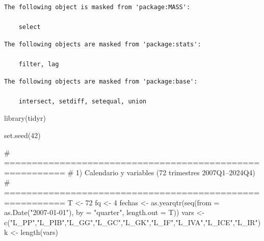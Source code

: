 \documentclass[
  spanish,
  letterpaper,
  DIV=11,
  numbers=noendperiod]{scrartcl}
\newenvironment{Shaded}{\begin{snugshade}}{\end{snugshade}}
\newcommand{\AttributeTok}[1]{\textcolor[rgb]{0.40,0.45,0.13}{#1}}
\newcommand{\CommentTok}[1]{\textcolor[rgb]{0.37,0.37,0.37}{#1}}
\newcommand{\DecValTok}[1]{\textcolor[rgb]{0.68,0.00,0.00}{#1}}
\newcommand{\FunctionTok}[1]{\textcolor[rgb]{0.28,0.35,0.67}{#1}}
\newcommand{\NormalTok}[1]{\textcolor[rgb]{0.00,0.23,0.31}{#1}}
\newcommand{\OtherTok}[1]{\textcolor[rgb]{0.00,0.23,0.31}{#1}}
\newcommand{\StringTok}[1]{\textcolor[rgb]{0.13,0.47,0.30}{#1}}
\begin{document}
\begin{verbatim}
The following object is masked from 'package:MASS':

    select
\end{verbatim}

\begin{verbatim}
The following objects are masked from 'package:stats':

    filter, lag
\end{verbatim}

\begin{verbatim}
The following objects are masked from 'package:base':

    intersect, setdiff, setequal, union
\end{verbatim}

\begin{Shaded}
\begin{Highlighting}[]
\FunctionTok{library}\NormalTok{(tidyr)}

\FunctionTok{set.seed}\NormalTok{(}\DecValTok{42}\NormalTok{)}

\CommentTok{\# =========================================================}
\CommentTok{\# 1) Calendario y variables (72 trimestres 2007Q1–2024Q4)}
\CommentTok{\# =========================================================}
\NormalTok{T  }\OtherTok{\textless{}{-}} \DecValTok{72}
\NormalTok{fq }\OtherTok{\textless{}{-}} \DecValTok{4}
\NormalTok{fechas }\OtherTok{\textless{}{-}} \FunctionTok{as.yearqtr}\NormalTok{(}\FunctionTok{seq}\NormalTok{(}\AttributeTok{from =} \FunctionTok{as.Date}\NormalTok{(}\StringTok{"2007{-}01{-}01"}\NormalTok{),}
                         \AttributeTok{by =} \StringTok{"quarter"}\NormalTok{, }\AttributeTok{length.out =}\NormalTok{ T))}
\NormalTok{vars }\OtherTok{\textless{}{-}} \FunctionTok{c}\NormalTok{(}\StringTok{"L\_PP"}\NormalTok{,}\StringTok{"L\_PIB"}\NormalTok{,}\StringTok{"L\_GG"}\NormalTok{,}\StringTok{"L\_GC"}\NormalTok{,}\StringTok{"L\_GK"}\NormalTok{,}\StringTok{"L\_IF"}\NormalTok{,}\StringTok{"L\_IVA"}\NormalTok{,}\StringTok{"L\_ICE"}\NormalTok{,}\StringTok{"L\_IR"}\NormalTok{)}
\NormalTok{k }\OtherTok{\textless{}{-}} \FunctionTok{length}\NormalTok{(vars)}


\end{Highlighting}
\end{Shaded}
\end{document}
